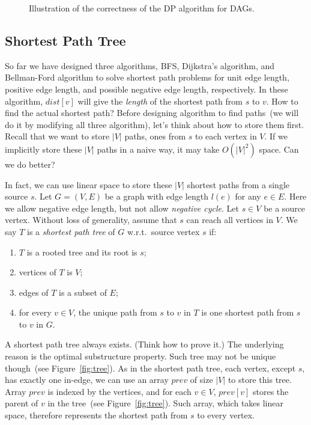 \begin{figure}[h]
\centering{}
\caption{Illustration of the correctness of the DP algorithm for DAGs.}
\label{fig:dag}
\end{figure}


\subsection*{Shortest Path Tree}

So far we have designed three algorithms, BFS, Dijkstra's algorithm, and Bellman-Ford algorithm
to solve shortest path problems for unit edge length, positive edge length, and possible negative edge length, respectively.
In these algorithm, $dist[v]$ will give the \emph{length} of the
shortest path from $s$ to $v$. How to find the actual shortest path?
Before designing algorithm to find paths~(we will do it by modifying all three algorithm),
let's think about how to store them first.
Recall that we want to store $|V|$ paths, ones from $s$ to each vertex in $V$.
If we implicitly store these $|V|$ paths in a naive way, it may take $O(|V|^2)$ space.
Can we do better?

In fact, we can use linear space to store these $|V|$ shortest paths from a single source $s$.
Let $G = (V, E)$ be a graph with edge length $l(e)$ for any $e \in E$.
Here we allow negative edge length, but not allow \emph{negative cycle}. %
Let $s \in V$ be a source vertex.  Without loss of generality, assume that $s$ can reach all vertices in $V$.
We say $T$ is a \emph{shortest path tree} of $G$ w.r.t.\ source vertex $s$ if:
\vspace*{-\topsep}
\begin{enumerate}
\item $T$ is a rooted tree and its root is $s$;
\item vertices of $T$ is $V$;
\item edges of $T$ is a subset of $E$;
\item for every $v\in V$, the unique path from $s$ to $v$ in $T$ is one shortest path from $s$ to $v$ in $G$.
\end{enumerate}

A shortest path tree always exists. (Think how to prove it.) 
The underlying reason is the optimal substructure property.
Such tree may not be unique though~(see Figure~\ref{fig:tree}).
As in the shortest path tree, each vertex, except $s$, has exactly one in-edge, we can use an array $prev$ of size $|V|$
to store this tree. Array $prev$ is indexed by the vertices, and for each $v\in V$, $prev[v]$ stores the parent of $v$
in the tree~(see Figure~\ref{fig:tree}).
Such array, which takes linear space, therefore represents the shortest path from $s$ to every vertex.

